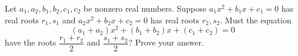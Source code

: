 Let $a_1,a_2,b_1,b_2,c_1,c_2$ be nonzero real numbers. Suppose $a_1x^2+b_1x+c_1=0$ has real roots $r_1,s_1$ and $a_2x^2+b_2x+c_2=0$ has real roots $r_2,s_2$. Must the equation
\[(a_1+a_2)x^2+(b_1+b_2)x+(c_1+c_2)=0\]
have the roots $\dfrac{r_1+r_2}{2}$ and $\dfrac{s_1+s_2}{2}$? Prove your answer.
